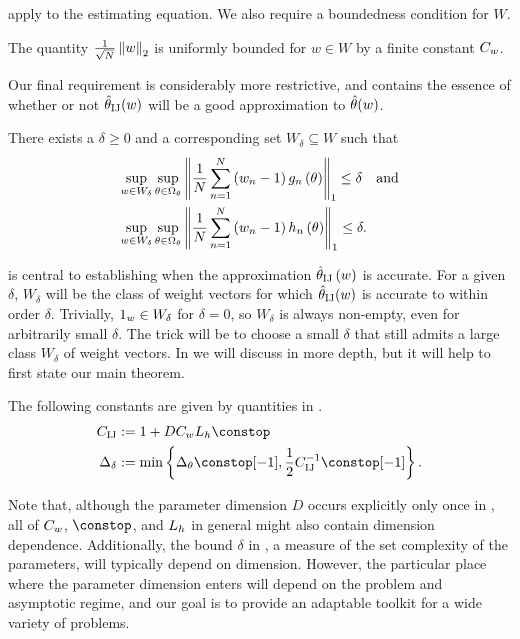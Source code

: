 \coreassum apply to the estimating equation.  We also require
a boundedness condition for $W$.
%
\begin{assumption} \label{assu:paper_weight_bounded}
The quantity
$\frac{1}{\sqrt{N}}\left\Vert w\right\Vert_{2}$ is uniformly bounded for $w\in W$ by a finite
constant $C_{w}$.
\end{assumption}
%
Our final requirement is considerably more restrictive, and
contains the essence of whether or not $\hat{\theta}_{\textrm{IJ}}(w)$ will be a good approximation
to $\hat{\theta}(w)$.
%
\begin{condition}
\label{cond:paper_uniform_bound}There exists a $\delta\ge0$ and
a corresponding set $W_{\delta}\subseteq W$ such that
%
\begin{align*}
\sup_{w\in W_{\delta}}\sup_{
    \theta\in\Omega_{\theta}} &\left\Vert \frac{1}{N}\sum_{n=1}^{N}
    \left(w_{n}-1\right)g_{n}\left(\theta\right)\right\Vert_{1}  \le\delta
\quad\textrm{and} \\
\sup_{w\in W_{\delta}}\sup_{
    \theta\in\Omega_{\theta}} &\left\Vert \frac{1}{N}\sum_{n=1}^{N}
    \left(w_{n}-1\right)h_{n}\left(\theta\right)\right\Vert_{1}  \le\delta.
\end{align*}
\end{condition}
%
 is central to establishing when the approximation
$\hat{\theta}_{\textrm{IJ}}\left(w\right)$ is accurate. For a given $\delta$, $W_{\delta}$ will be
the class of weight vectors for which $\hat{\theta}_{\textrm{IJ}}(w)$ is accurate to within order
$\delta$. Trivially, $1_{w}\in W_{\delta}$ for $\delta=0$, so $W_{\delta}$ is
always non-empty, even for arbitrarily small $\delta$. The trick will be to
choose a small $\delta$ that still admits a large class $W_{\delta}$ of weight
vectors. In  we will discuss
 in more depth, but it will help to first state our
main theorem.
%
\begin{defn}
\label{defref:constants_definition}  The following constants are given by
quantities in \paperallcoreassum.
\begin{align*}
    \constij &:= 1+D \constw \liph \constop \\
    \deltasize &:=
        \min\left\{ \thetasize\constop[-1],
                    \frac{1}{2}\constij^{-1}\constop[-1]\right\}.
\end{align*}
\end{defn}
%
Note that, although the parameter dimension $D$ occurs explicitly only once in
, all of $C_{w}$, $\constop$, and $L_{h}$ in
general might also contain dimension dependence. Additionally, the bound
$\delta$ in , a measure of the set complexity of
the parameters, will typically depend on dimension. However, the particular
place where the parameter dimension enters will depend on the problem and
asymptotic regime, and our goal is to provide an adaptable toolkit for a wide
variety of problems.

